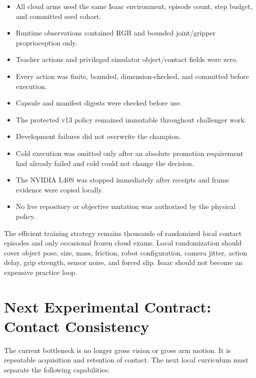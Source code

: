\documentclass[11pt,a4paper]{article}
\begin{document}
\begin{itemize}
\item All cloud arms used the same Isaac environment, episode count, step
budget, and committed seed cohort.
\item Runtime observations contained RGB and bounded joint/gripper
proprioception only.
\item Teacher actions and privileged simulator object/contact fields were zero.
\item Every action was finite, bounded, dimension-checked, and committed before
execution.
\item Capsule and manifest digests were checked before use.
\item The protected v13 policy remained immutable throughout challenger work.
\item Development failures did not overwrite the champion.
\item Cold execution was omitted only after an absolute promotion requirement
had already failed and cold could not change the decision.
\item The NVIDIA L40S was stopped immediately after receipts and frame evidence
were copied locally.
\item No live repository or objective mutation was authorized by the physical
policy.
\end{itemize}

The efficient training strategy remains thousands of randomized local contact
episodes and only occasional frozen cloud exams.  Local randomization should
cover object pose, size, mass, friction, robot configuration, camera jitter,
action delay, grip strength, sensor noise, and forced slip.  Isaac should not
become an expensive practice loop.

\section{Next Experimental Contract: Contact Consistency}

The current bottleneck is no longer gross vision or gross arm motion.  It is
repeatable acquisition and retention of contact.  The next local curriculum
must separate the following capabilities:
\end{document}
